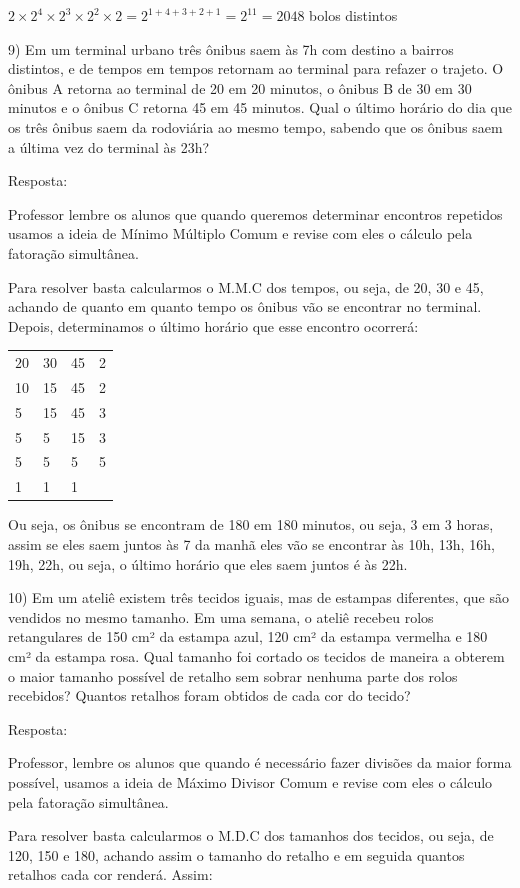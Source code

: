 \(2 \times 2^{4} \times 2^{3} \times 2^{2} \times 2 = 2^{1 + 4 + 3 + 2 + 1} = 2^{11} = 2048\)
bolos distintos

9) Em um terminal urbano três ônibus saem às 7h com destino a bairros
distintos, e de tempos em tempos retornam ao terminal para refazer o
trajeto. O ônibus A retorna ao terminal de 20 em 20 minutos, o ônibus B
de 30 em 30 minutos e o ônibus C retorna 45 em 45 minutos. Qual o último
horário do dia que os três ônibus saem da rodoviária ao mesmo tempo,
sabendo que os ônibus saem a última vez do terminal às 23h?

Resposta:

Professor lembre os alunos que quando queremos determinar encontros
repetidos usamos a ideia de Mínimo Múltiplo Comum e revise com eles o
cálculo pela fatoração simultânea.

Para resolver basta calcularmos o M.M.C dos tempos, ou seja, de 20, 30 e
45, achando de quanto em quanto tempo os ônibus vão se encontrar no
terminal. Depois, determinamos o último horário que esse encontro
ocorrerá:

\begin{longtable}[]{@{}llll@{}}
\toprule
\endhead
\(20\) & 30 & 45 & 2\tabularnewline
10 & 15 & 45 & 2\tabularnewline
5 & 15 & 45 & 3\tabularnewline
5 & 5 & 15 & 3\tabularnewline
5 & 5 & 5 & 5\tabularnewline
1 & 1 & 1 &\tabularnewline
\bottomrule
\end{longtable}

Ou seja, os ônibus se encontram de 180 em 180 minutos, ou seja, 3 em 3
horas, assim se eles saem juntos às 7 da manhã eles vão se encontrar às
10h, 13h, 16h, 19h, 22h, ou seja, o último horário que eles saem juntos
é às 22h.

10) Em um ateliê existem três tecidos iguais, mas de estampas
diferentes, que são vendidos no mesmo tamanho. Em uma semana, o ateliê
recebeu rolos retangulares de 150 cm² da estampa azul, 120 cm² da
estampa vermelha e 180 cm² da estampa rosa. Qual tamanho foi cortado os
tecidos de maneira a obterem o maior tamanho possível de retalho sem
sobrar nenhuma parte dos rolos recebidos? Quantos retalhos foram obtidos
de cada cor do tecido?

Resposta:

Professor, lembre os alunos que quando é necessário fazer divisões da
maior forma possível, usamos a ideia de Máximo Divisor Comum e revise
com eles o cálculo pela fatoração simultânea.

Para resolver basta calcularmos o M.D.C dos tamanhos dos tecidos, ou
seja, de 120, 150 e 180, achando assim o tamanho do retalho e em seguida
quantos retalhos cada cor renderá. Assim:

